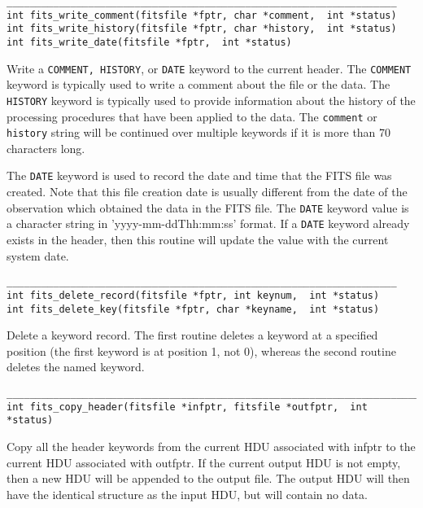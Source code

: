 \documentclass[11pt]{article}
\begin{document}
\begin{verbatim}
___________________________________________________________________
int fits_write_comment(fitsfile *fptr, char *comment,  int *status)
int fits_write_history(fitsfile *fptr, char *history,  int *status)
int fits_write_date(fitsfile *fptr,  int *status)
\end{verbatim}

Write a {\tt COMMENT, HISTORY}, or {\tt DATE} keyword to the current
header.  The {\tt COMMENT} keyword is typically used to write a comment
about the file or the data.  The {\tt HISTORY} keyword is typically
used to provide information about the history of the processing
procedures that have been applied to the data.  The {\tt comment} or
{\tt history} string will be continued over multiple keywords if it is
more than 70 characters long.

The {\tt DATE} keyword is used to record the date and time that the
FITS file was created.  Note that this file creation date is usually
different from the date of the observation which obtained the data in
the FITS file.  The {\tt DATE} keyword value is a character string in
'yyyy-mm-ddThh:mm:ss' format. If a {\tt DATE} keyword already exists in
the header, then this routine will update the value with the current
system date.

\begin{verbatim}
___________________________________________________________________
int fits_delete_record(fitsfile *fptr, int keynum,  int *status)
int fits_delete_key(fitsfile *fptr, char *keyname,  int *status)
\end{verbatim}

Delete a keyword record. The first routine deletes a keyword at a
specified position (the first keyword is at position 1, not 0),
whereas the second routine deletes the named keyword.

\begin{verbatim}
_______________________________________________________________________
int fits_copy_header(fitsfile *infptr, fitsfile *outfptr,  int *status)
\end{verbatim}

Copy all the header keywords from the current HDU associated with
infptr to the current HDU associated with outfptr.  If the current
output HDU is not empty, then a new HDU will be appended to the output
file. The output HDU will then have the identical structure as the
input HDU, but will contain no data.

\newpage
\end{document}
